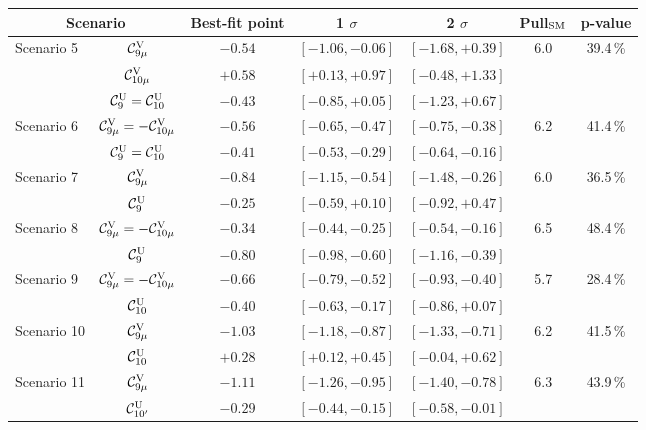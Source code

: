 \documentclass[11pt,amsmath,amssymb]{article}
\newcommand{\Cc}[1]{{\cal C}_{#1}}
\begin{document}
\begin{table*}[h!] \small \begin{center}
\begin{tabular}{lc||c|c|c|c|c}
\multicolumn{2}{c||}{Scenario} & Best-fit point & 1 $\sigma$ & 2 $\sigma$ & Pull$_{\rm SM}$ & p-value \\
\hline\hline
\multirow{ 3}{*}{Scenario 5} &$\Cc{9\mu}^{\rm V}$ & $-0.54$ & $[-1.06,-0.06]$ & $[-1.68,+0.39]$ &
\multirow{ 3}{*}{6.0} & \multirow{ 3}{*}{39.4\,\%} \\
&$\Cc{10\mu}^{\rm V}$ & $+0.58$ & $[+0.13,+0.97]$ & $[-0.48,+1.33]$ & \\
&$\Cc{9}^{\rm U}=\Cc{10}^{\rm U}$ & $-0.43$ & $[-0.85,+0.05]$ & $[-1.23,+0.67]$ &\\
\hline
\multirow{ 2}{*}{Scenario 6}&$\Cc{9\mu}^{\rm V}=-\Cc{10\mu}^{\rm V}$ & $-0.56$ & $[-0.65,-0.47]$ & $[-0.75,-0.38]$ &
\multirow{ 2}{*}{6.2} & \multirow{ 2}{*}{41.4\,\%} \\
&$\Cc{9}^{\rm U}=\Cc{10}^{\rm U}$ & $-0.41$ & $[-0.53,-0.29]$ & $[-0.64,-0.16]$ &\\
\hline
\multirow{ 2}{*}{Scenario 7}&$\Cc{9\mu}^{\rm V}$ & $-0.84$ & $[-1.15,-0.54]$ & $[-1.48,-0.26]$ &
\multirow{ 2}{*}{6.0} & \multirow{ 2}{*}{36.5\,\% }  \\
&$\Cc{9}^{\rm U}$ & $-0.25$ & $[-0.59,+0.10]$ & $[-0.92,+0.47]$  &\\
\hline
\multirow{ 2}{*}{Scenario 8}&$\Cc{9\mu}^{\rm V}=-\Cc{10\mu}^{\rm V}$ & $-0.34$ & $[-0.44,-0.25]$ & $[-0.54,-0.16]$ &
\multirow{ 2}{*}{6.5} & \multirow{ 2}{*}{48.4\,\%} \\
&$\Cc{9}^{\rm U}$ & $-0.80$ & $[-0.98,-0.60]$ & $[-1.16,-0.39]$ &\\
\hline\hline
\multirow{ 2}{*}{Scenario 9}&$\Cc{9\mu}^{\rm V}=-\Cc{10\mu}^{\rm V}$ & $-0.66$ & $[-0.79,-0.52]$ & $[-0.93,-0.40]$ &
\multirow{ 2}{*}{5.7} & \multirow{ 2}{*}{28.4\,\%} \\
&$\Cc{10}^{\rm U}$ & $-0.40$ & $[-0.63,-0.17]$ & $[-0.86,+0.07]$ &\\
\hline
\multirow{ 2}{*}{Scenario 10}&$\Cc{9\mu}^{\rm V}$ & $-1.03$ & $[-1.18,-0.87]$ & $[-1.33,-0.71]$ &
\multirow{ 2}{*}{6.2} & \multirow{ 2}{*}{41.5\,\%} \\
&$\Cc{10}^{\rm U}$ & $+0.28$ & $[+0.12,+0.45]$ & $[-0.04,+0.62]$ &\\
\hline
\multirow{ 2}{*}{Scenario 11}&$\Cc{9\mu}^{\rm V}$ & $-1.11$ & $[-1.26,-0.95]$ & $[-1.40,-0.78]$ &
\multirow{ 2}{*}{6.3} & \multirow{ 2}{*}{43.9\,\%} \\
&$\Cc{10'}^{\rm U}$ & $-0.29$ & $[-0.44,-0.15]$ & $[-0.58,-0.01]$ &\\

\end{tabular}
\end{center}
\end{table*}
\end{document}
